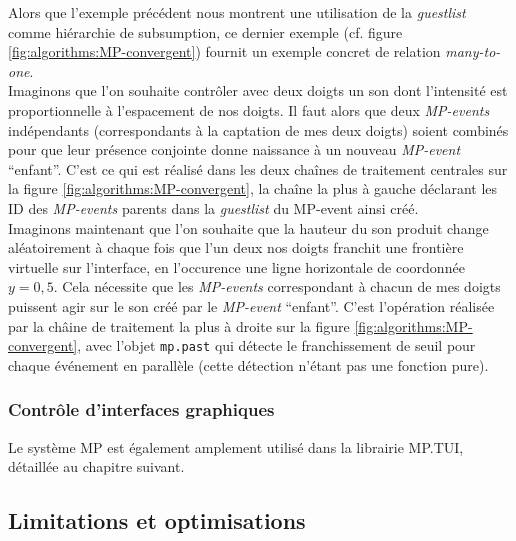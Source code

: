 \noindent Alors que l'exemple précédent nous montrent une utilisation de la \textit{guestlist} comme hiérarchie de subsumption, ce dernier exemple (cf. figure \ref{fig:algorithms:MP-convergent}) fournit un exemple concret de relation \textit{many-to-one}.\\
\indent Imaginons que l'on souhaite contrôler avec deux doigts un son dont l'intensité est proportionnelle à l'espacement de nos doigts. Il faut alors que deux \textit{MP-events} indépendants (correspondants à la captation de mes deux doigts) soient combinés pour que leur présence conjointe donne naissance à un nouveau \textit{MP-event} ``enfant''. C'est ce qui est réalisé dans les deux chaînes de traitement centrales sur la figure \ref{fig:algorithms:MP-convergent}, la chaîne la plus à gauche déclarant les ID des \textit{MP-events} parents dans la \textit{guestlist} du MP-event ainsi créé.\\
\indent Imaginons maintenant que l'on souhaite que la hauteur du son produit change aléatoirement à chaque fois que l'un deux nos doigts franchit une frontière virtuelle sur l'interface, en l'occurence une ligne horizontale de coordonnée $y=0,5$. Cela nécessite que les \textit{MP-events} correspondant à chacun de mes doigts puissent agir sur le son créé par le \textit{MP-event} ``enfant''. C'est l'opération réalisée par la châine de traitement la plus à droite sur la figure \ref{fig:algorithms:MP-convergent}, avec l'objet \verb|mp.past| qui détecte le franchissement de seuil pour chaque événement en parallèle (cette détection n'étant pas une fonction pure).


\subsubsection*{Contrôle d'interfaces graphiques}
\label{sec:algorithms:example-mpTUI}
\noindent Le système MP est également amplement utilisé dans la librairie MP.TUI, détaillée au chapitre suivant.


\subsection{Limitations et optimisations}

